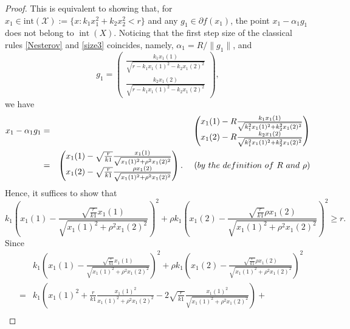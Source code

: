 \documentclass[10pt,a4paper]{amsart}
\begin{document}
\begin{proof}
	This is equivalent to showing that, for $x_1 \in \text{int}(\mathcal{X}) := \{ x : k_1 x_1^2 + k_2 x_2^2 < r \}$ and any $g_1 \in \partial f(x_1)$, the point $x_1 - \alpha_1 g_1$ does not belong to $\operatorname{int}(X)$. Noticing that the first step size of the classical rules \eqref{Nesterov} and \eqref{size3} coincides, namely, $\alpha_1 = R / \|g_1\|$, and
	\begin{equation*}
		g_1 =
		\begin{pmatrix}
			\frac{k_1 x_1(1)}{\sqrt{r - k_1 x_1(1)^{2} - k_2 x_1(2)^{2}}} \\
			\frac{k_2 x_1(2)}{\sqrt{r - k_1 x_1(1)^{2} - k_2 x_1(2)^{2}}}
		\end{pmatrix},
	\end{equation*}
	we have 
	\begin{eqnarray}
		x_1 - \alpha_1 g_1 &=&
		\begin{pmatrix}
			x_1(1) - R\frac{k_1 x_1(1)}{\sqrt{k_1^{2} x_1(1)^{2} + k_2^{2} x_1(2)^{2}}} \\
			x_1(2) - R\frac{k_2 x_1(2)}{\sqrt{k_1^{2} x_1(1)^{2} + k_2^{2} x_1(2)^{2}}}
		\end{pmatrix}\nonumber\\
		&=&
		\begin{pmatrix}
			x_1(1) - \sqrt{\frac{r}{k1}}\frac{x_1(1)}{\sqrt{x_1(1)^{2} + \rho^{2} x_1(2)^{2}}} \\
			x_1(2) - \sqrt{\frac{r}{k1}}\frac{\rho x_1(2)}{\sqrt{x_1(1)^{2} + \rho^{2} x_1(2)^{2}}}
		\end{pmatrix}. \nonumber~~~~({\rm by ~the~ definition~ of~  R~ and ~ \rho})
	\end{eqnarray}
	Hence, it suffices to show that
	\begin{equation*}
		k_1 \left(x_1(1) - \frac{\sqrt{\frac{r}{k1}}x_1(1)}{\sqrt{x_1(1)^{2} + \rho^{2} x_1(2)^{2}}}\right)^2 + \rho k_1 \left(x_1(2) - \frac{\sqrt{\frac{r}{k1}}\rho x_1(2)}{\sqrt{x_1(1)^{2} + \rho^{2} x_1(2)^{2}}}\right)^2 \geq r.
	\end{equation*}
	Since 
	\begin{eqnarray}
		&&k_1 \left(x_1(1) - \frac{\sqrt{\frac{r}{k1}}x_1(1)}{\sqrt{x_1(1)^{2} + \rho^{2} x_1(2)^{2}}}\right)^2 + \rho k_1 \left(x_1(2) - \frac{\sqrt{\frac{r}{k1}}\rho x_1(2)}{\sqrt{x_1(1)^{2} + \rho^{2} x_1(2)^{2}}}\right)^2 \nonumber\\
		&=& k_1 \left(x_1(1)^2 + \frac{r}{k1}\frac{x_1(1)^2}{x_1(1)^{2} + \rho^{2} x_1(2)^{2}} - 2\sqrt{\frac{r}{k1}}\frac{x_1(1)^2}{\sqrt{x_1(1)^{2} + \rho^{2} x_1(2)^{2}}}\right) + \nonumber\\

\end{eqnarray}
\end{proof}
\end{document}
